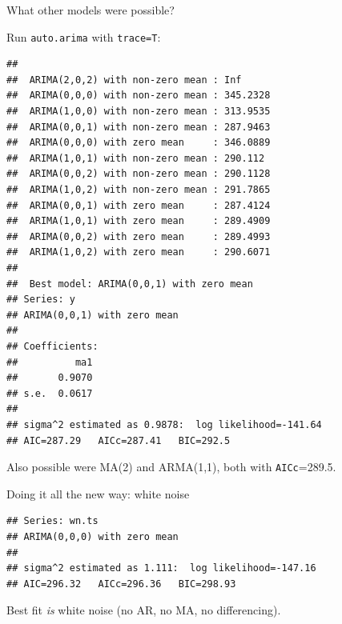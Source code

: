 \begin{frame}[fragile]{What other models were possible?}
  
Run \texttt{auto.arima} with \texttt{trace=T}:

{\footnotesize
\begin{knitrout}
\color{fgcolor}\begin{kframe}
\begin{alltt}
\end{alltt}
\begin{verbatim}
## 
##  ARIMA(2,0,2) with non-zero mean : Inf
##  ARIMA(0,0,0) with non-zero mean : 345.2328
##  ARIMA(1,0,0) with non-zero mean : 313.9535
##  ARIMA(0,0,1) with non-zero mean : 287.9463
##  ARIMA(0,0,0) with zero mean     : 346.0889
##  ARIMA(1,0,1) with non-zero mean : 290.112
##  ARIMA(0,0,2) with non-zero mean : 290.1128
##  ARIMA(1,0,2) with non-zero mean : 291.7865
##  ARIMA(0,0,1) with zero mean     : 287.4124
##  ARIMA(1,0,1) with zero mean     : 289.4909
##  ARIMA(0,0,2) with zero mean     : 289.4993
##  ARIMA(1,0,2) with zero mean     : 290.6071
## 
##  Best model: ARIMA(0,0,1) with zero mean
## Series: y 
## ARIMA(0,0,1) with zero mean     
## 
## Coefficients:
##          ma1
##       0.9070
## s.e.  0.0617
## 
## sigma^2 estimated as 0.9878:  log likelihood=-141.64
## AIC=287.29   AICc=287.41   BIC=292.5
\end{verbatim}
\end{kframe}
\end{knitrout}
}

Also possible were MA(2) and ARMA(1,1), both with \texttt{AICc}=289.5.
  
  
\end{frame}

\begin{frame}[fragile]{Doing it all the new way: white noise}
  
\begin{knitrout}
\color{fgcolor}\begin{kframe}
\begin{alltt}
\hlkwb{=}
\end{alltt}
\begin{verbatim}
## Series: wn.ts 
## ARIMA(0,0,0) with zero mean     
## 
## sigma^2 estimated as 1.111:  log likelihood=-147.16
## AIC=296.32   AICc=296.36   BIC=298.93
\end{verbatim}
\end{kframe}
\end{knitrout}

Best fit \emph{is} white noise (no AR, no MA, no differencing). 

\end{frame}


